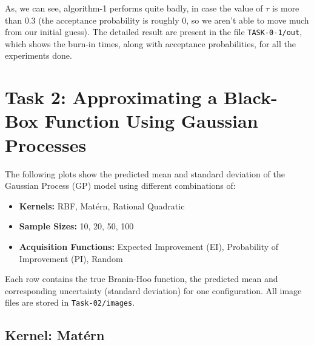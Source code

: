 \documentclass[a4paper,12pt]{article}
\begin{document}
As, we can see, algorithm-1 performs quite badly, in case the value of $\tau$ is more than $0.3$ (the acceptance probability is roughly 0, so we aren't able to move much from our initial guess). The detailed result are present in the file \texttt{TASK-0-1/out}, which shows the burn-in times, along with acceptance probabilities, for all the experiments done.

\section*{Task 2: Approximating a Black-Box Function Using Gaussian Processes}

The following plots show the predicted mean and standard deviation of the Gaussian Process (GP) model using different combinations of:
\begin{itemize}
    \item \textbf{Kernels:} RBF, Matérn, Rational Quadratic
    \item \textbf{Sample Sizes:} 10, 20, 50, 100
    \item \textbf{Acquisition Functions:} Expected Improvement (EI), Probability of Improvement (PI), Random
\end{itemize}

Each row contains the true Branin-Hoo function, the predicted mean and corresponding uncertainty (standard deviation) for one configuration. All image files are stored in \texttt{Task-02/images}.

\subsection*{Kernel: Matérn}
\end{document}
